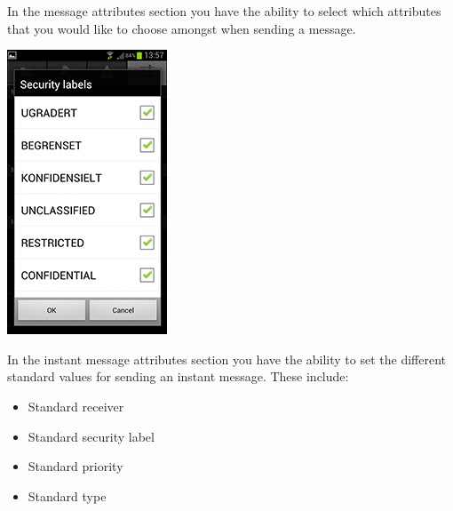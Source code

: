 \newpage
In the message attributes section you have the ability to select which attributes that you would like to choose amongst when sending a message.
   \begin{center}
    \includegraphics{SecurityLabelsShown}
  \end{center}
\newpage
In the instant message attributes section you have the ability to set the different standard values for sending an instant message. These include:

\begin{itemize}
\item{}Standard receiver
\item{}Standard security label
\item{}Standard priority
\item{}Standard type
\end{itemize}

